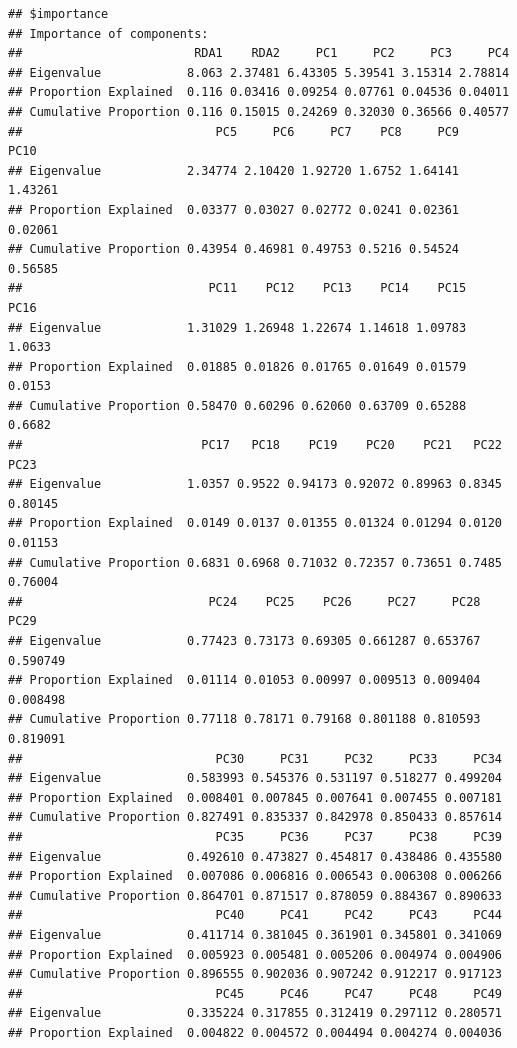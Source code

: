 \documentclass[]{article}
\begin{document}
\begin{verbatim}
## $importance
## Importance of components:
##                        RDA1    RDA2     PC1     PC2     PC3     PC4
## Eigenvalue            8.063 2.37481 6.43305 5.39541 3.15314 2.78814
## Proportion Explained  0.116 0.03416 0.09254 0.07761 0.04536 0.04011
## Cumulative Proportion 0.116 0.15015 0.24269 0.32030 0.36566 0.40577
##                           PC5     PC6     PC7    PC8     PC9    PC10
## Eigenvalue            2.34774 2.10420 1.92720 1.6752 1.64141 1.43261
## Proportion Explained  0.03377 0.03027 0.02772 0.0241 0.02361 0.02061
## Cumulative Proportion 0.43954 0.46981 0.49753 0.5216 0.54524 0.56585
##                          PC11    PC12    PC13    PC14    PC15   PC16
## Eigenvalue            1.31029 1.26948 1.22674 1.14618 1.09783 1.0633
## Proportion Explained  0.01885 0.01826 0.01765 0.01649 0.01579 0.0153
## Cumulative Proportion 0.58470 0.60296 0.62060 0.63709 0.65288 0.6682
##                         PC17   PC18    PC19    PC20    PC21   PC22    PC23
## Eigenvalue            1.0357 0.9522 0.94173 0.92072 0.89963 0.8345 0.80145
## Proportion Explained  0.0149 0.0137 0.01355 0.01324 0.01294 0.0120 0.01153
## Cumulative Proportion 0.6831 0.6968 0.71032 0.72357 0.73651 0.7485 0.76004
##                          PC24    PC25    PC26     PC27     PC28     PC29
## Eigenvalue            0.77423 0.73173 0.69305 0.661287 0.653767 0.590749
## Proportion Explained  0.01114 0.01053 0.00997 0.009513 0.009404 0.008498
## Cumulative Proportion 0.77118 0.78171 0.79168 0.801188 0.810593 0.819091
##                           PC30     PC31     PC32     PC33     PC34
## Eigenvalue            0.583993 0.545376 0.531197 0.518277 0.499204
## Proportion Explained  0.008401 0.007845 0.007641 0.007455 0.007181
## Cumulative Proportion 0.827491 0.835337 0.842978 0.850433 0.857614
##                           PC35     PC36     PC37     PC38     PC39
## Eigenvalue            0.492610 0.473827 0.454817 0.438486 0.435580
## Proportion Explained  0.007086 0.006816 0.006543 0.006308 0.006266
## Cumulative Proportion 0.864701 0.871517 0.878059 0.884367 0.890633
##                           PC40     PC41     PC42     PC43     PC44
## Eigenvalue            0.411714 0.381045 0.361901 0.345801 0.341069
## Proportion Explained  0.005923 0.005481 0.005206 0.004974 0.004906
## Cumulative Proportion 0.896555 0.902036 0.907242 0.912217 0.917123
##                           PC45     PC46     PC47     PC48     PC49
## Eigenvalue            0.335224 0.317855 0.312419 0.297112 0.280571
## Proportion Explained  0.004822 0.004572 0.004494 0.004274 0.004036

\end{verbatim}
\end{document}
